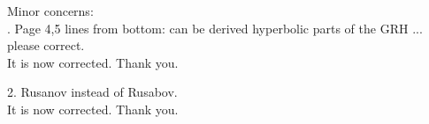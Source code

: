 \documentclass{article}
\begin{document}
\bigskip

{\color{blue}
\noindent Minor concerns: \\
. Page 4,5 lines from bottom: can be derived hyperbolic parts of the GRH ... please correct.\\}
It is now corrected. Thank you.

\bigskip

{\color{blue}
 2. Rusanov instead of Rusabov.\\}
It is now corrected. Thank you.


\end{document}
